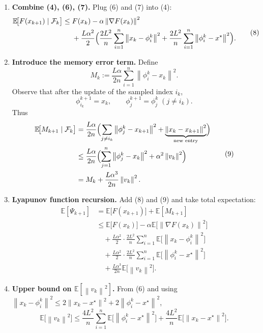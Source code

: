 \documentclass{article}
\newcommand{\E}{\mathbb{E}}
\newcommand{\norm}[1]{\left\lVert#1\right\rVert}
\begin{document}
\begin{enumerate}
\item[Step 6.] \textbf{Combine (4), (6), (7).}  
Plug (6) and (7) into (4):
\[
\begin{aligned}
\E\!\bigl[F(x_{k+1})\mid\mathcal{F}_k\bigr]
\le\;& F(x_k)-\alpha\norm{\nabla F(x_k)}^{2}\\
&+\frac{L\alpha^{2}}{2}\Bigl(
      \frac{2L^{2}}{n}\sum_{i=1}^{n}\norm{x_k-\phi_i^{k}}^{2}
      +\frac{2L^{2}}{n}\sum_{i=1}^{n}\norm{\phi_i^{k}-x^{\star}}^{2}
      \Bigr).
\end{aligned}
\tag{8}
\]

\item[Step 7.] \textbf{Introduce the memory error term.}  
Define
\[
M_k := \frac{L\alpha}{2n}\sum_{i=1}^{n}\norm{\phi_i^{k}-x_k}^{2}.
\]
Observe that after the update of the sampled index $i_k$,
\[
\phi_{i_k}^{k+1}=x_k,\qquad
\phi_{j}^{k+1}=\phi_{j}^{k}\;(j\neq i_k).
\]
Thus
\[
\begin{aligned}
\E\!\bigl[M_{k+1}\mid\mathcal{F}_k\bigr]
&= \frac{L\alpha}{2n}\Bigl(
      \sum_{j\neq i_k}\norm{\phi_j^{k}-x_{k+1}}^{2}
      +\underbrace{\norm{x_k-x_{k+1}}^{2}}_{\text{new entry}}
   \Bigr)\\
&\le \frac{L\alpha}{2n}\Bigl(
      \sum_{j=1}^{n}\norm{\phi_j^{k}-x_k}^{2}
      +\alpha^{2}\norm{v_k}^{2}
   \Bigr)\\
&= M_k + \frac{L\alpha^{3}}{2n}\norm{v_k}^{2}.
\end{aligned}
\tag{9}
\]

\item[Step 8.] \textbf{Lyapunov function recursion.}  
Add (8) and (9) and take total expectation:
\[
\begin{aligned}
\E[\Psi_{k+1}]
&= \E\!\bigl[F(x_{k+1})\bigr] + \E[M_{k+1}]\\
&\le \E\!\bigl[F(x_k)\bigr] -\alpha\E\!\bigl[\norm{\nabla F(x_k)}^{2}\bigr] \\
&\quad +\frac{L\alpha^{2}}{2}\cdot\frac{2L^{2}}{n}\sum_{i=1}^{n}\E\!\bigl[\norm{x_k-\phi_i^{k}}^{2}\bigr] \\
&\quad +\frac{L\alpha^{2}}{2}\cdot\frac{2L^{2}}{n}\sum_{i=1}^{n}\E\!\bigl[\norm{\phi_i^{k}-x^{\star}}^{2}\bigr] \\
&\quad +\frac{L\alpha^{3}}{2n}\E\!\bigl[\norm{v_k}^{2}\bigr] .
\end{aligned}
\tag{10}
\]

\item[Step 9.] \textbf{Upper bound on $\E[\norm{v_k}^{2}]$.}  
From (6) and using $\norm{x_k-\phi_i^{k}}^{2}\le 2\norm{x_k-x^{\star}}^{2}+2\norm{\phi_i^{k}-x^{\star}}^{2}$,
\[
\E\!\bigl[\norm{v_k}^{2}\bigr]
\le \frac{4L^{2}}{n}\sum_{i=1}^{n}\E\!\bigl[\norm{\phi_i^{k}-x^{\star}}^{2}\bigr]
   +\frac{4L^{2}}{n}\E\!\bigl[\norm{x_k-x^{\star}}^{2}\bigr].
\tag{11}
\]


\end{enumerate}
\end{document}
